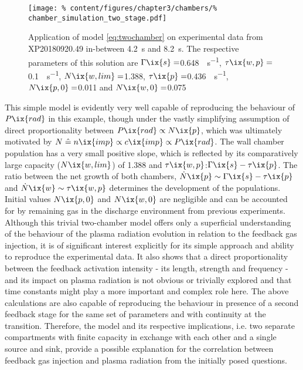 %
        \begin{figure}[t]%
            \centering%
            \texttt{[image: \%
                content/figures/chapter3/chambers/\%
                chamber\_simulation\_two\_stage.pdf]}%
            \caption{Application of model \cref{eq:twochamber} on experimental data from XP20180920.49 in-between \SI{4.2}{\second} and \SI{8.2}{\second}. The respective parameters of this solution are $\Gamma\ix{s}=$\SI{0.648}{\arbitraryunit\per\second}, $\tau\ix{w,p}=$\SI{0.1}{\arbitraryunit\per\second}, $N\ix{w,lim}=$\SI{1.388}{\arbitraryunit}, $\tau\ix{p}=$\SI{0.436}{\arbitraryunit\per\second}, $N\ix{p,0}=$\SI{0.011}{\arbitraryunit} and $N\ix{w,0}=$\SI{0.075}{\arbitraryunit}}\label{fig:twochamber_twostage}%
        \end{figure}%
%
        This simple model is evidently very well capable of reproducing the behaviour of $P\ix{rad}$ in this example, though under the vastly simplifying assumption of direct proportionality between $P\ix{rad}\propto N\ix{p}$, which was ultimately motivated by $N\mathrel{\hat{=}}n\ix{imp}\propto c\ix{imp}\propto P\ix{rad}$. The wall chamber population has a very small positive slope, which is reflected by its comparatively large capacity ($N\ix{w,lim}$) of 1.388 and $\tau\ix{w,p}$:$\Gamma\ix{s}-\tau\ix{p}$. The ratio between the net growth of both chambers, $\dot{N}\ix{p}\sim\Gamma\ix{s}-\tau\ix{p}$ and $\dot{N}\ix{w}\sim\tau\ix{w,p}$ determines the development of the populations. Initial values $N\ix{p,0}$ and $N\ix{w,0}$ are negligible and can be accounted for by remaining gas in the discharge environment from previous experiments.\\%
        Although this trivial two-chamber model offers only a superficial understanding of the behaviour of the plasma radiation evolution in relation to the feedback gas injection, it is of significant interest explicitly for its simple approach and ability to reproduce the experimental data. It also shows that a direct proportionality between the feedback activation intensity - its length, strength and frequency - and its impact on plasma radiation is not obvious or trivially explored and that time constants might play a more important and complex role here. The above calculations are also capable of reproducing the behaviour in presence of a second feedback stage for the same set of parameters and with continuity at the transition. Therefore, the model and its respective implications, i.e. two separate compartments with finite capacity in exchange with each other and a single source and sink, provide a possible explanation for the correlation between feedback gas injection and plasma radiation from the initially posed questions.%
%
